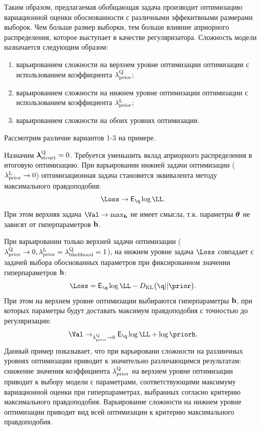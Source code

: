 Таким образом, предлагаемая обобщающая задача производит оптимизацию вариационной оценки обоснованности с различными  эффекитвными размерами выборок. Чем больше размер выборки, тем больше влияние априорного распределения, которое выступает в качестве регуляризатора. Сложность модели назначается следующим образом:
\begin{enumerate}
\item варьированием сложности на верхнем уровне оптимизации оптимизации с использованием коэффициента $\lambda_\text{prior}^\text{Q}$;
\item варьированием сложности на нижнем уровне оптимизации оптимизации с использованием коэффициента $\lambda_\text{prior}^\text{L}$;
\item варьированием сложности на обоих уровнях оптимизации.
\end{enumerate}
Рассмотрим различие вариантов 1-3 на примере.
\begin{example}
Назначим $\boldsymbol{\lambda}_\text{struct}^\text{Q} = 0$.
Требуется уменьшить вклад априорного распределения в итоговую оптимизацию.
При варьировании нижней задачи оптимизации ($\lambda_\text{prior}^\text{L} \to 0$) оптимизационная задача становится эквивалента методу максимального правдоподобия:
\[
   \Loss \to \E_{\q} \log \LL.
\]
При этом верхняя задача $\Val \to \max_{\h}$ не имеет смысла, т.к. параметры $\boldsymbol{\theta}$ не зависят от гиперпараметров $\mathbf{h}$.

При варьировании только верхней задачи оптимизации ($\lambda_\text{prior}^\text{Q} \to 0, \lambda_\text{prior}^\text{L} = \lambda_\text{likelihood}^\text{Q} = 1$), на нижнем уровне задача $\Loss$ совпадает с задачей выбора обоснованных параметров при фиксированном значении гиперпараметров $\mathbf{h}$:
\[
   \Loss = \E_{\q} \log \LL - \KL{\q}{\prior}.
\]
При этом на верхнем уровне оптимизации выбираются гиперпараметры $\mathbf{h}$, при которых параметры будут доставать максимум правдоподобия с точностью до регуляризации:
\[
    \Val \to_{\lamCQ \to 0} \E_{\q} \log \LL  + \log \priorh.
\]
Данный пример показывает, что при варьировани  сложности на разлинчных уровнях оптимизации приводит к значительно различающимся результатам: снижение значения коэффициента $\lambda_\text{prior}^\text{Q}$ на верхнем уровне оптимизации приводит к выбору модели с параметрами, соответствующими максимуму вариационной оценки при гиперпараметрах, выбранных согласно критерию максимального правдоподобия. Варьирование сложности на нижнем уровне оптимизации приводит вид всей оптимизации к критерию максимального правдоподобия. 
\end{example}

